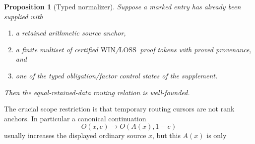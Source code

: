 \documentclass[11pt]{article}
\newtheorem{proposition}[theorem]{Proposition}
\newcommand{\WIN}{\ensuremath{\mathrm{WIN}}}
\newcommand{\LOSS}{\ensuremath{\mathrm{LOSS}}}
\begin{document}
\begin{proposition}[Typed normalizer]\label{prop:typed-normalizer}
Suppose a marked entry has already been supplied with
\begin{enumerate}[label=(\roman*)]
\item a retained arithmetic source anchor,
\item a finite multiset of certified \WIN/\LOSS\ proof tokens with proved
      provenance, and
\item one of the typed obligation/factor control states of the supplement.
\end{enumerate}
Then the equal-retained-data routing relation is well-founded.
\end{proposition}

The crucial scope restriction is that temporary routing cursors are not rank
anchors. In particular a canonical continuation
\[
 O(x,e)\longrightarrow O(A(x),1-e)
\]
usually increases the displayed ordinary source $x$, but this $A(x)$ is only
\end{document}
